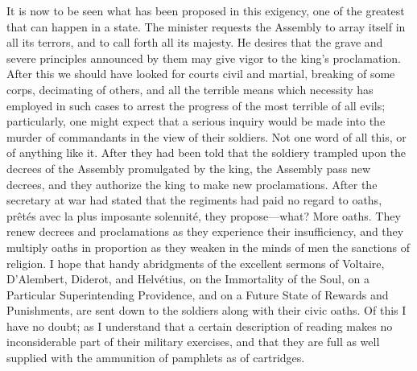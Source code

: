 It is now to be seen what has been proposed in this exigency, one of the greatest that can happen in a state. The minister requests the Assembly to array itself in all its terrors, and to call forth all its majesty. He desires that the grave and severe principles announced by them may give vigor to the king's proclamation. After this we should have looked for courts civil and martial, breaking of some corps, decimating of others, and all the terrible means which necessity has employed in such cases to arrest the progress of the most terrible of all evils; particularly, one might expect that a serious inquiry would be made into the murder of commandants in the view of their soldiers. Not one word of all this, or of anything like it. After they had been told that the soldiery trampled upon the decrees of the Assembly promulgated by the king, the Assembly pass new decrees, and they authorize the king to make new proclamations. After the secretary at war had stated that the regiments had paid no regard to oaths, prêtés avec la plus imposante solennité, they propose—what? More oaths. They renew decrees and proclamations as they experience their insufficiency, and they multiply oaths in proportion as they weaken in the minds of men the sanctions of religion. I hope that handy abridgments of the excellent sermons of Voltaire, D'Alembert, Diderot, and Helvétius, on the Immortality of the Soul, on a Particular Superintending Providence, and on a Future State of Rewards and Punishments, are sent down to the soldiers along with their civic oaths. Of this I have no doubt; as I understand that a certain description of reading makes no inconsiderable part of their military exercises, and that they are full as well supplied with the ammunition of pamphlets as of cartridges.

